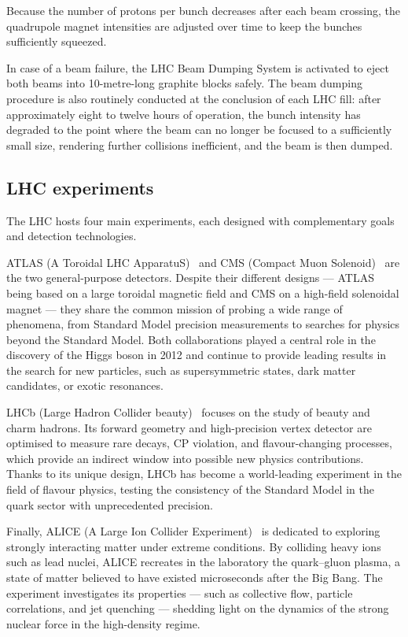 Because the number of protons per bunch decreases after each beam crossing, the quadrupole magnet intensities are adjusted over time to keep the bunches sufficiently squeezed. 

In case of a beam failure, the LHC Beam Dumping System is activated to eject both beams into 10-metre-long graphite blocks safely. The beam dumping procedure is also routinely conducted at the conclusion of each LHC fill: after approximately eight to twelve hours of operation, the bunch intensity has degraded to the point where the beam can no longer be focused to a sufficiently small size, rendering further collisions inefficient, and the beam is then dumped.

\newpage

\subsection{LHC experiments}
\label{subsec:LHCExperiments}

The LHC hosts four main experiments, each designed with complementary goals and detection technologies. 

ATLAS (A Toroidal LHC ApparatuS)~\cite{ATLAS_detector} and CMS (Compact Muon Solenoid)~\cite{CMS_detector} are the two general-purpose detectors. Despite their different designs --- ATLAS being based on a large toroidal magnetic field and CMS on a high-field solenoidal magnet --- they share the common mission of probing a wide range of phenomena, from Standard Model precision measurements to searches for physics beyond the Standard Model. Both collaborations played a central role in the discovery of the Higgs boson in 2012 and continue to provide leading results in the search for new particles, such as supersymmetric states, dark matter candidates, or exotic resonances.

LHCb (Large Hadron Collider beauty)~\cite{LHCb_detector} focuses on the study of beauty and charm hadrons. Its forward geometry and high-precision vertex detector are optimised to measure rare decays, CP violation, and flavour-changing processes, which provide an indirect window into possible new physics contributions. Thanks to its unique design, LHCb has become a world-leading experiment in the field of flavour physics, testing the consistency of the Standard Model in the quark sector with unprecedented precision.

Finally, ALICE (A Large Ion Collider Experiment)~\cite{ALICE_detector} is dedicated to exploring strongly interacting matter under extreme conditions. By colliding heavy ions such as lead nuclei, ALICE recreates in the laboratory the quark–gluon plasma, a state of matter believed to have existed microseconds after the Big Bang. The experiment investigates its properties --- such as collective flow, particle correlations, and jet quenching --- shedding light on the dynamics of the strong nuclear force in the high-density regime.

